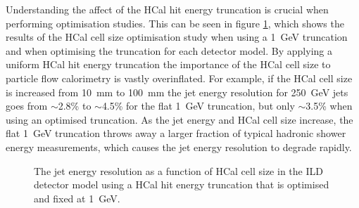Understanding the affect of the HCal hit energy truncation is crucial when performing optimisation studies.  This can be seen in figure \ref{fig:jerhcalcellopt}, which shows the results of the HCal cell size optimisation study when using a 1~GeV truncation and when optimising the truncation for each detector model.  By applying a uniform HCal hit energy truncation the importance of the HCal cell size to particle flow calorimetry is vastly overinflated.  For example, if the HCal cell size is increased from 10~mm to 100~mm the jet energy resolution for 250~GeV jets goes from $\sim$2.8\% to $\sim$4.5\% for the flat 1~GeV truncation, but only $\sim$3.5\% when using an optimised truncation.  As the jet energy and HCal cell size increase, the flat 1~GeV truncation throws away a larger fraction of typical hadronic shower energy measurements, which causes the jet energy resolution to degrade rapidly.  

\begin{figure}[h!]
\caption[The jet energy resolution as a function of HCal cell size in the ILD detector model using a HCal hit energy truncation that is \protect{} optimised and \protect{} fixed at 1~GeV.]{The jet energy resolution as a function of HCal cell size in the ILD detector model using a HCal hit energy truncation that is \protect{} optimised and \protect{} fixed at 1~GeV.}
\label{fig:jerhcalcellopt}
\end{figure}

